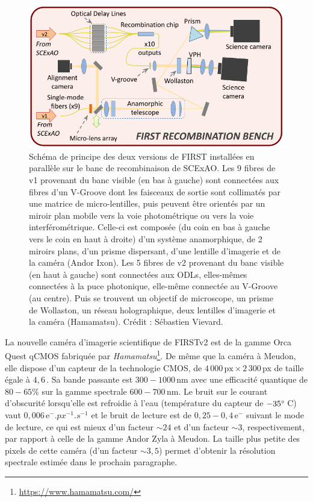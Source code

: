 \begin{figure}[ht!]
    \centering
    \includegraphics[width=\figwidth]{Figure_Chap5/20220601_SCExAO_FIRSTRecombBench_V1_V2_Scheme.png}
    \caption[Schéma de principe des deux versions de FIRST installées en parallèle sur le banc de recombinaison de SCExAO.]{Schéma de principe des deux versions de FIRST installées en parallèle sur le banc de recombinaison de SCExAO. Les $9$ fibres de v1 provenant du banc visible (en bas à gauche) sont connectées aux fibres d'un V-Groove dont les faisceaux de sortie sont collimatés par une matrice de micro-lentilles, puis peuvent être orientés par un miroir plan mobile vers la voie photométrique ou vers la voie interférométrique. Celle-ci est composée (du coin en bas à gauche vers le coin en haut à droite) d'un système anamorphique, de 2 miroirs plans, d'un prisme dispersant, d'une lentille d'imagerie et de la caméra (Andor Ixon). Les 5 fibres de v2 provenant du banc visible (en haut à gauche) sont connectées aux ODLs, elles-mêmes connectées à la puce photonique, elle-même connectée au V-Groove (au centre). Puis se trouvent un objectif de microscope, un prisme de Wollaston, un réseau holographique, deux lentilles d'imagerie et la caméra (Hamamatsu). Crédit : Sébastien Vievard.}
    \label{fig:FIRSTV1V2FinalScheme}
\end{figure}

La nouvelle caméra d'imagerie scientifique de \ac{FIRSTv2} est de la gamme Orca Quest qCMOS fabriquée par \textit{Hamamatsu}\footnote{\url{https://www.hamamatsu.com/}}. De même que la caméra à Meudon, elle dispose d'un capteur de la technologie \ac{CMOS}, de $4\,000 \,\text{px} \times 2\,300 \,$px de taille égale à $4,6 \,$\um. Sa bande passante est $300 - 1000 \,$nm avec une efficacité quantique de $80 - 65\%$ sur la gamme spectrale $600 - 700 \,$nm. Le bruit sur le courant d'obscurité lorsqu'elle est refroidie à l'eau (température du capteur de $-35^{\circ} \,$C) vaut $0,006 \,\text{e}^-.px^{-1}.s^{-1}$ et le bruit de lecture est de $0,25 - 0,4 \,\text{e}^-$ suivant le mode de lecture, ce qui est mieux d'un facteur $\sim 24$ et d'un facteur $\sim 3$, respectivement, par rapport à celle de la gamme Andor Zyla à Meudon. La taille plus petite des pixels de cette caméra (d'un facteur $\sim 3,5$) permet d'obtenir la résolution spectrale estimée dans le prochain paragraphe.

